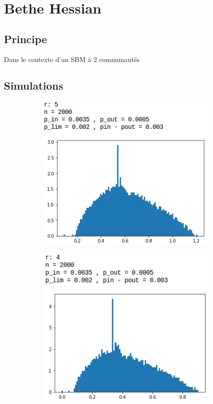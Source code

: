 \section{Bethe Hessian}
\subsection{Principe}
Dans le contexte d'un SBM à 2 communautés 
\subsection{Simulations}
\begin{figure}[H]
	\begin{subfigure}{.5\textwidth}
		\centering
		\includegraphics[scale=0.58]{static/bh_5.png}
		\label{bh5}
	\end{subfigure}
	\begin{subfigure}{.5\textwidth}
		\centering
		\includegraphics[scale=0.58]{static/bh_3.png}

\end{subfigure}
\end{figure}
